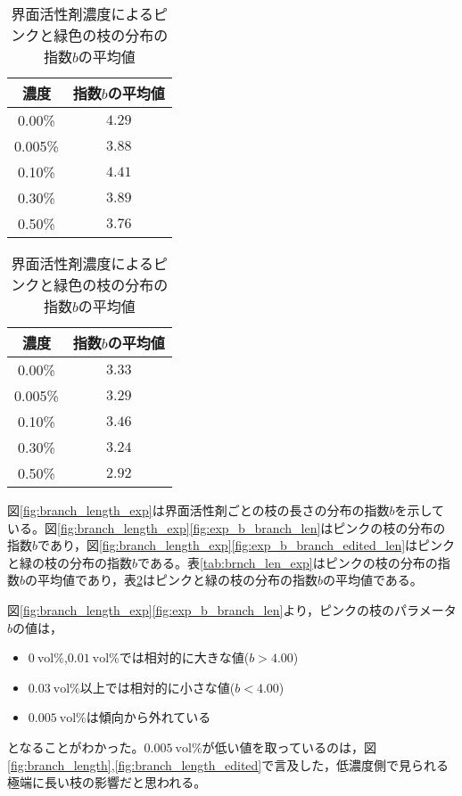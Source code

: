 \documentclass[autodetect-engine,dvi=dvipdfmx,a4paper,ja=standard,oneside,openany,11pt,draft]{bxjsbook}
\begin{document}
\begin{table}[htbp]
  \begin{minipage}{0.45\textwidth}
    \centering
    \caption{界面活性剤濃度によるピンク色の枝の分布の指数$b$の平均値}
    \begin{tabular}{|c|c|}
      \hline
      濃度      & 指数$b$の平均値 \\ \hline\hline
      0.00\%  & $4.29$    \\ \hline
      0.005\% & $3.88$    \\ \hline
      0.10\%  & $4.41$    \\ \hline
      0.30\%  & $3.89$    \\ \hline
      0.50\%  & $3.76$    \\
      \hline
    \end{tabular}
    \label{tab:brnch_len_exp}
  \end{minipage}
  \hfill
  \begin{minipage}{0.45\textwidth}
    \centering
    \caption{界面活性剤濃度によるピンクと緑色の枝の分布の指数$b$の平均値}
    \begin{tabular}{|c|c|}
      \hline
      濃度      & 指数$b$の平均値 \\ \hline\hline
      0.00\%  & $3.33$    \\ \hline
      0.005\% & $3.29$    \\ \hline
      0.10\%  & $3.46$    \\ \hline
      0.30\%  & $3.24$    \\ \hline
      0.50\%  & $2.92$    \\
      \hline
    \end{tabular}
    \label{tab:branch_len_exp_edited}
  \end{minipage}
\end{table}
図\ref{fig:branch_length_exp}は界面活性剤ごとの枝の長さの分布の指数$b$を示している。図\ref{fig:branch_length_exp}\ref{fig:exp_b_branch_len}はピンクの枝の分布の指数$b$であり，図\ref{fig:branch_length_exp}\ref{fig:exp_b_branch_edited_len}はピンクと緑の枝の分布の指数$b$である。表\ref{tab:brnch_len_exp}はピンクの枝の分布の指数$b$の平均値であり，表\ref{tab:branch_len_exp_edited}はピンクと緑の枝の分布の指数$b$の平均値である。

図\ref{fig:branch_length_exp}\ref{fig:exp_b_branch_len}より，ピンクの枝のパラメータ$b$の値は，
\begin{itemize}
  \item $\SI{0}{\mathrm{vol}\%}$,$\SI{0.01}{\mathrm{vol}\%}$では相対的に大きな値($b>4.00$)
  \item $\SI{0.03}{\mathrm{vol}\%}$以上では相対的に小さな値($b<4.00$)
  \item $\SI{0.005}{\mathrm{vol}\%}$は傾向から外れている
\end{itemize}
となることがわかった。$\SI{0.005}{\mathrm{vol}\%}$が低い値を取っているのは，図\ref{fig:branch_length},\ref{fig:branch_length_edited}で言及した，低濃度側で見られる極端に長い枝の影響だと思われる。
\end{document}
